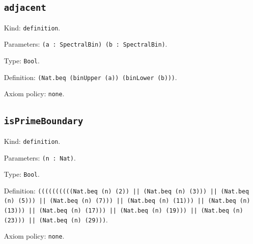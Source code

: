 \documentclass[11pt]{article}
\begin{document}
\subsection*{\texttt{adjacent}}
\noindent Kind: \texttt{definition}.\par
\noindent Parameters: \texttt{(a : SpectralBin) (b : SpectralBin)}.\par
\noindent Type: \texttt{Bool}.\par
\noindent Definition: \texttt{(Nat.beq (binUpper (a)) (binLower (b)))}.\par
\noindent Axiom policy: \texttt{none}.\par
\subsection*{\texttt{isPrimeBoundary}}
\noindent Kind: \texttt{definition}.\par
\noindent Parameters: \texttt{(n : Nat)}.\par
\noindent Type: \texttt{Bool}.\par
\noindent Definition: \texttt{((((((((((Nat.beq (n) (2)) || (Nat.beq (n) (3))) || (Nat.beq (n) (5))) || (Nat.beq (n) (7))) || (Nat.beq (n) (11))) || (Nat.beq (n) (13))) || (Nat.beq (n) (17))) || (Nat.beq (n) (19))) || (Nat.beq (n) (23))) || (Nat.beq (n) (29)))}.\par
\noindent Axiom policy: \texttt{none}.\par
\end{document}
